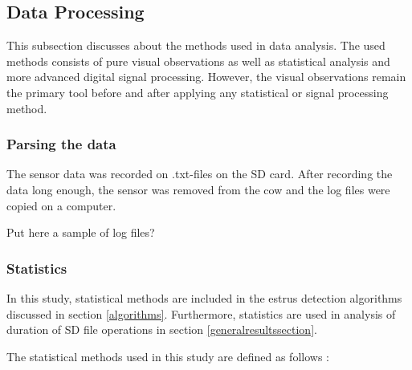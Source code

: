 \documentclass[english,12pt,a4paper,pdftex,elec,utf8]{aaltothesis}
\begin{document}
\subsection{Data Processing} \label{dataprocessingsection}

This subsection discusses about the methods used in data analysis. The used methods consists of pure visual observations as well as statistical analysis and more advanced digital signal processing. However, the visual observations remain the primary tool before and after applying any statistical or signal processing method.

\subsubsection*{Parsing the data}

The sensor data was recorded on .txt-files on the SD card. After recording the data long enough, the sensor was removed from the cow and the log files were copied on a computer. 

Put here a sample of log files?

\subsubsection{Statistics} \label{statisticssection}

In this study, statistical methods are included in the estrus detection algorithms discussed in section \ref{algorithms}. Furthermore, statistics are used in analysis of duration of SD file operations in section \ref{generalresultssection}.


The statistical methods used in this study are defined as follows \cite{maoltaulukotmatematiikka}:
\end{document}

